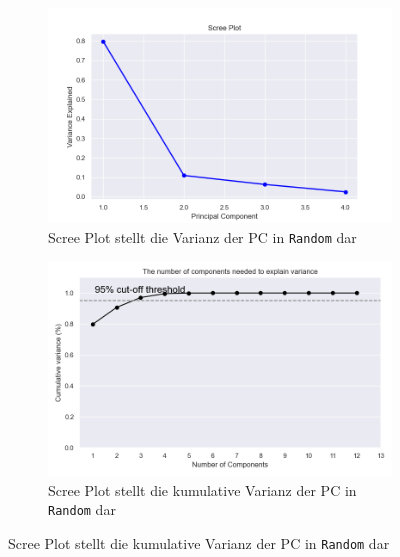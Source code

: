 \begin{figure}[H]
    \begin{subfigure}{.5\textwidth}
        \includegraphics[width=\textwidth]{images/30_results/random-scree.png}
        \caption{Scree Plot stellt die Varianz der PC in \texttt{Random} dar}
        \label{fig:scree-random}
    \end{subfigure}%
    \begin{subfigure}{.5\textwidth}
        \includegraphics[width=\textwidth]{images/30_results/random-scree-cum.png}
        \caption{Scree Plot stellt die kumulative Varianz der PC in \texttt{Random} dar}
        \label{fig:scree-cum-random}
    \end{subfigure}
\end{figure}

\medskip

